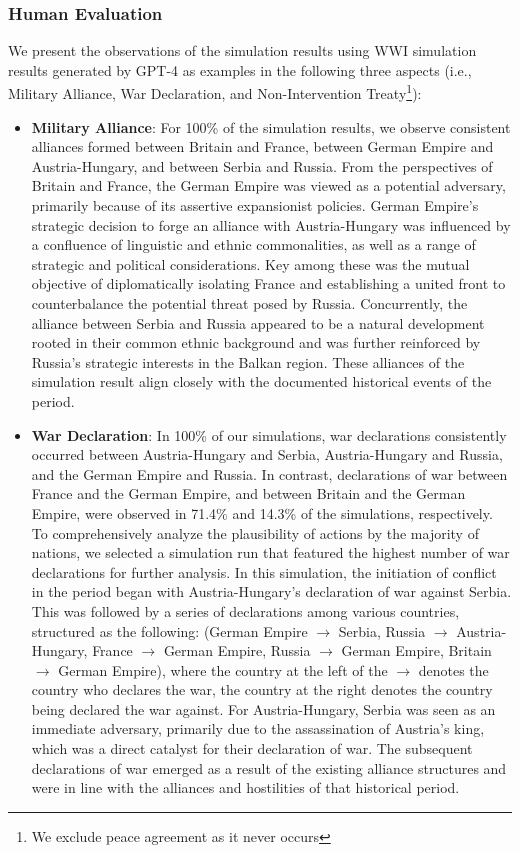 \documentclass{article}
\begin{document}
\subsubsection{Human Evaluation} 
We present the observations of the simulation results using WWI simulation results generated by GPT-4 as examples in the following three aspects (i.e., Military Alliance, War Declaration, and Non-Intervention Treaty\footnote{We exclude peace agreement as it never occurs}): 
\begin{itemize}
    \item \textbf{Military Alliance}: For 100\% of the simulation results, we observe consistent alliances formed between Britain and France, between German Empire and Austria-Hungary, and between Serbia and Russia. From the perspectives of Britain and France, the German Empire was viewed as a potential adversary, primarily because of its assertive expansionist policies. German Empire's strategic decision to forge an alliance with Austria-Hungary was influenced by a confluence of linguistic and ethnic commonalities, as well as a range of strategic and political considerations. Key among these was the mutual objective of diplomatically isolating France and establishing a united front to counterbalance the potential threat posed by Russia. Concurrently, the alliance between Serbia and Russia appeared to be a natural development rooted in their common ethnic background and was further reinforced by Russia's strategic interests in the Balkan region. These alliances of the simulation result align closely with the documented historical events of the period.
    \item \textbf{War Declaration}: In 100\% of our simulations, war declarations consistently occurred between Austria-Hungary and Serbia, Austria-Hungary and Russia, and the German Empire and Russia. In contrast, declarations of war between France and the German Empire, and between Britain and the German Empire, were observed in 71.4\% and 14.3\% of the simulations, respectively. To comprehensively analyze the plausibility of actions by the majority of nations, we selected a simulation run that featured the highest number of war declarations for further analysis. In this simulation, the initiation of conflict in the period began with Austria-Hungary's declaration of war against Serbia. This was followed by a series of declarations among various countries, structured as the following: (German Empire $\rightarrow$ Serbia, Russia $\rightarrow$ Austria-Hungary, France $\rightarrow$ German Empire, Russia $\rightarrow$ German Empire, Britain$ \rightarrow $ German Empire), where the country at the left of the $\rightarrow$ denotes the country who declares the war, the country at the right denotes the country being declared the war against. For Austria-Hungary, Serbia was seen as an immediate adversary, primarily due to the assassination of Austria's king, which was a direct catalyst for their declaration of war. The subsequent declarations of war emerged as a result of the existing alliance structures and were in line with the alliances and hostilities of that historical period.
    

\end{itemize}
\end{document}
